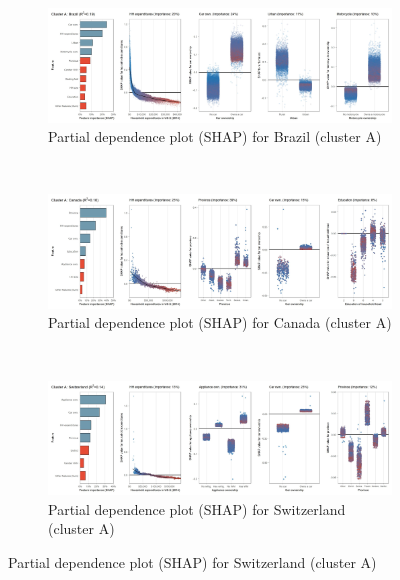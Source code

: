 \begin{figure}[ht!]\ContinuedFloat
    \centering
   \begin{subfigure}[b]{\textwidth}
         \centering
         \caption{Partial dependence plot (SHAP) for Brazil (cluster A)}
         \label{fig:5b_BRA}
         \includegraphics[width=\textwidth]{Figure 5b/Figure_5b_BRA}
         \end{subfigure}
    \\
    \vspace{0.5cm}
   \begin{subfigure}[b]{\textwidth}
         \centering
         \caption{Partial dependence plot (SHAP) for Canada (cluster A)}
         \label{fig:5b_CAN}
         \includegraphics[width=\textwidth]{Figure 5b/Figure_5b_CAN}
         \end{subfigure}
    \\
    \vspace{0.5cm}
   \begin{subfigure}[b]{\textwidth}
         \centering
         \caption{Partial dependence plot (SHAP) for Switzerland (cluster A)}
         \label{fig:5b_CHE}
         \includegraphics[width=\textwidth]{Figure 5b/Figure_5b_CHE}

\end{subfigure}
\end{figure}
